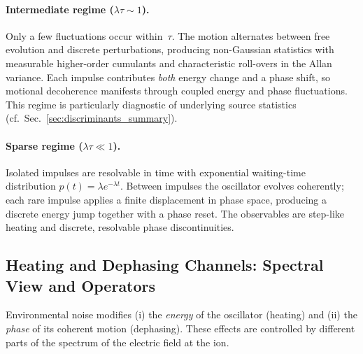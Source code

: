 \paragraph{Intermediate regime ($\lambda\tau\!\sim\!1$).}
Only a few fluctuations occur within~$\tau$.  The motion alternates between
free evolution and discrete perturbations, producing non-Gaussian
statistics with measurable higher-order cumulants and characteristic
roll-overs in the Allan variance.  Each impulse contributes \emph{both}
energy change and a phase shift, so motional decoherence manifests through
coupled energy and phase fluctuations.
This regime is particularly diagnostic of underlying source statistics
(cf.\ Sec.~\ref{sec:discriminants_summary}).

\paragraph{Sparse regime ($\lambda\tau\!\ll\!1$).}
Isolated impulses are resolvable in time with exponential waiting-time
distribution $p(t)=\lambda e^{-\lambda t}$.  Between impulses the oscillator
evolves coherently; each rare impulse applies a finite displacement in
phase space, producing a discrete energy jump together with a phase reset.
The observables are step-like heating and discrete, resolvable phase
discontinuities.

\subsection*{Heating and Dephasing Channels: Spectral View and Operators}

Environmental noise modifies (i) the \emph{energy} of the oscillator
(heating) and (ii) the \emph{phase} of its coherent motion (dephasing).
These effects are controlled by different parts of the spectrum of the
electric field at the ion.

